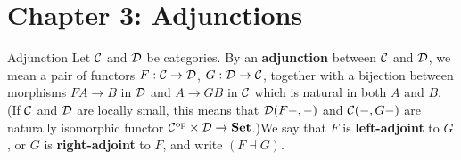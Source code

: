 \documentclass{article}
\begin{document}
\section{Chapter 3: Adjunctions}
\begin{fancydefine}{Adjunction}
    Let $\mathcal{C}$ and $\mathcal{D}$ be categories. By an \textbf{adjunction} between $\mathcal{C}$ and $\mathcal{D}$, we mean a pair of functors $F : \mathcal{C} \to \mathcal{D}$, $G : \mathcal{D} \to \mathcal{C}$, together with a bijection between morphisms $FA \to B$ in $\mathcal{D}$ and $A \to GB$ in $\mathcal{C}$ which is natural in both $A$ and $B$. \gap (If $\mathcal{C}$ and $\mathcal{D}$ are locally small, this means that $\mathcal{D}(F-, -)$ and $\mathcal{C}(-, G-)$ are naturally isomorphic functor $\mathcal{C}^{\text{op}} \times \mathcal{D} \to \textbf{Set}$.)\gap We say that $F$ is \textbf{left-adjoint} to $G$ , or $G$ is \textbf{right-adjoint} to $F$, and write $(F \dashv G)$.
\end{fancydefine}
\end{document}
